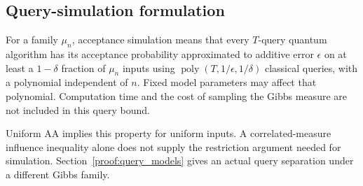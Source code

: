 \subsection{Query-simulation formulation}

For a family $\mu_n$, acceptance simulation means that every $T$-query quantum algorithm has its acceptance probability approximated to additive error $\epsilon$ on at least a $1-\delta$ fraction of $\mu_n$ inputs using $\operatorname{poly}(T,1/\epsilon,1/\delta)$ classical queries, with a polynomial independent of $n$. Fixed model parameters may affect that polynomial. Computation time and the cost of sampling the Gibbs measure are not included in this query bound.

Uniform AA implies this property for uniform inputs. A correlated-measure influence inequality alone does not supply the restriction argument needed for simulation. Section~\ref{proof:query_models} gives an actual query separation under a different Gibbs family.

